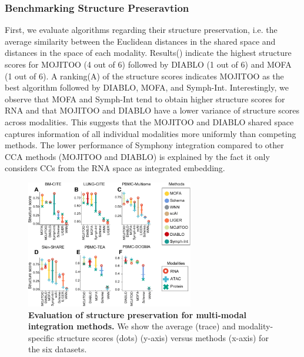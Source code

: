 \subsubsection{Benchmarking Structure Preseravtion}
First, we evaluate algorithms regarding their structure preservation, i.e. the average similarity between the Euclidean distances in the shared space and distances in the space of each modality\citep{jain2021multimap}. Results() indicate the highest structure scores for MOJITOO (4 out of 6) followed by DIABLO (1 out of 6) and MOFA (1 out of 6). A ranking(A) of the structure scores indicates MOJITOO as the best algorithm followed by DIABLO, MOFA, and Symph-Int. Interestingly, we observe that MOFA and Symph-Int tend to obtain higher structure scores for RNA and that MOJITOO and DIABLO have a lower variance of structure scores across modalities. This suggests that the MOJITOO and DIABLO shared space captures information of all individual modalities more uniformly than competing methods. The lower performance of Symphony integration compared to other CCA methods (MOJITOO and DIABLO) is explained by the fact it only considers CCs from the RNA space as integrated embedding.
\begin{figure}[!ht]
	\centering
	\includegraphics[width=0.65\textwidth]{structure/fig}
	\vspace{0.1cm}
	\caption[Evaluation of structure preservation for multi-modal integration methods.]{
	\textbf{Evaluation of structure preservation for multi-modal integration methods.}  We show the average (trace) and modality-specific structure scores (dots) (y-axis) versus methods (x-axis) for the six datasets.}
	\label{fig:structure}
\end{figure}

